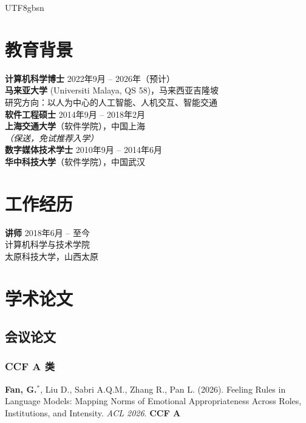 \documentclass[a4paper,10pt]{article}
\newcommand{\pubitem}[1]{\item #1}
\begin{document}
\begin{CJK*}{UTF8}{gbsn}
\section*{教育背景}

\noindent
\textbf{计算机科学博士} \hfill 2022年9月 -- 2026年（预计）\\
\textbf{马来亚大学} (Universiti Malaya, QS 58)，马来西亚吉隆坡 \\
研究方向：以人为中心的人工智能、人机交互、智能交通 \\

\noindent
\textbf{软件工程硕士} \hfill 2014年9月 -- 2018年2月 \\
\textbf{上海交通大学}（软件学院），中国上海 \\
\textit{（保送，免试推荐入学）} \\

\noindent
\textbf{数字媒体技术学士} \hfill 2010年9月 -- 2014年6月 \\
\textbf{华中科技大学}（软件学院），中国武汉

\section*{工作经历}

\noindent
\textbf{讲师} \hfill 2018年6月 -- 至今 \\
计算机科学与技术学院 \\
太原科技大学，山西太原

\section*{学术论文\footnotemark[1]}

\subsection*{会议论文}

\subsubsection*{CCF A 类}

\begin{enumerate}[label={[C\arabic*]}]
    \pubitem{\textbf{Fan, G.}$^*$, Liu D., Sabri A.Q.M., Zhang R., Pan L. (2026). Feeling Rules in Language Models: Mapping Norms of Emotional Appropriateness Across Roles, Institutions, and Intensity. \textit{ACL 2026}. \textbf{CCF A}}
    

\end{enumerate}
\end{CJK*}
\end{document}

